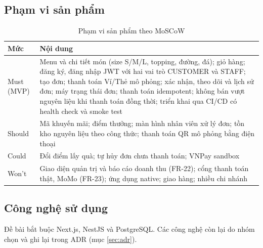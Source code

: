\subsection{Phạm vi sản phẩm}
\begin{table}[H]
\centering
\caption{Phạm vi sản phẩm theo MoSCoW}\label{tab:phamvi}
\begin{tabular}{@{}L{2.4cm}L{11.4cm}@{}}
\toprule
\textbf{Mức} & \textbf{Nội dung} \\ \midrule
Must (MVP) & Menu và chi tiết món (size S/M/L, topping, đường, đá); giỏ hàng; đăng ký, đăng nhập JWT với hai vai trò CUSTOMER và STAFF; tạo đơn; thanh toán Ví/Thẻ mô phỏng; xác nhận, theo dõi và lịch sử đơn; máy trạng thái đơn; thanh toán idempotent; không bán vượt nguyên liệu khi thanh toán đồng thời; triển khai qua CI/CD có health check và smoke test \\
Should & Mã khuyến mãi; điểm thưởng; màn hình nhân viên xử lý đơn; tồn kho nguyên liệu theo công thức; thanh toán QR mô phỏng bằng điện thoại \\
Could & Đổi điểm lấy quà; tự hủy đơn chưa thanh toán; VNPay sandbox \\
Won't & Giao diện quản trị và báo cáo doanh thu (FR-22); cổng thanh toán thật, MoMo (FR-23); ứng dụng native; giao hàng; nhiều chi nhánh \\
\bottomrule
\end{tabular}
\end{table}

\subsection{Công nghệ sử dụng}
Đề bài bắt buộc Next.js, NestJS và PostgreSQL. Các công nghệ còn lại do nhóm chọn và ghi lại trong ADR (mục \ref{sec:adr}).

